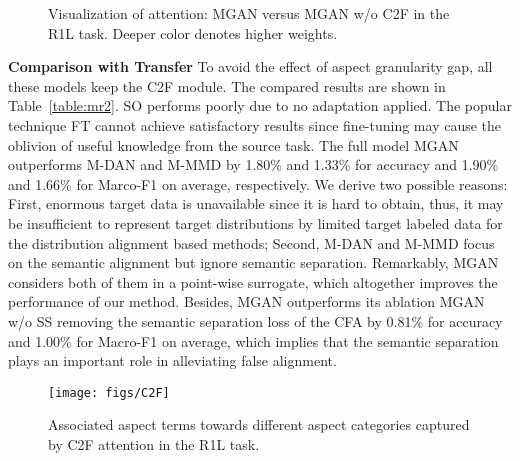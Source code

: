 \documentclass[letterpaper]{article} \usepackage{aaai19}  \usepackage{times}  \usepackage{latexsym}
\begin{document}
\begin{figure*}[tb!]
\centering
{}
\vspace{-4mm}
\caption{Visualization of attention: MGAN versus MGAN w/o C2F in the R1L task. Deeper color denotes higher weights.}
\vspace{-6mm}
\label{attention}
\end{figure*}


\vspace{1mm}
\noindent \textbf{Comparison with Transfer} To avoid the effect of aspect granularity gap, all these models keep the C2F module. The compared results are shown in Table~\ref{table:mr2}. SO performs poorly due to no adaptation applied. The popular technique FT cannot achieve satisfactory results since fine-tuning may cause the oblivion of useful knowledge from the source task. The full model MGAN outperforms M-DAN and M-MMD by 1.80\% and 1.33\% for accuracy and 1.90\% and 1.66\% for Marco-F1 on average, respectively. We derive two possible reasons: First, enormous target data is unavailable since it is hard to obtain, thus, it may be insufficient to represent target distributions by limited target labeled data for the distribution alignment based methods; Second, M-DAN and M-MMD focus on the semantic alignment but ignore semantic separation. Remarkably, MGAN considers both of them in a point-wise surrogate, which altogether improves the performance of our method. Besides, MGAN outperforms its ablation MGAN w/o SS removing the semantic separation loss of the CFA by 0.81\% for accuracy and 1.00\% for Macro-F1 on average, which implies that the semantic separation plays an important role in alleviating false alignment.

\begin{figure}[tb!]
\centering
\texttt{[image: figs/C2F]}
\vspace{-2mm}
\caption{Associated aspect terms towards different aspect categories captured by C2F attention in the R1L task.}
\vspace{-5mm}
\label{fig:words}
\end{figure}

\vspace{-1mm}
\end{document}
